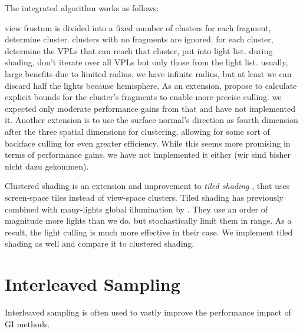 The integrated algorithm works as follows:
\begin{outline}
\1 view frustum is divided into a fixed number of clusters
\1 for each fragment, determine cluster. clusters with no fragments are ignored.
\1 for each cluster, determine the VPLs that can reach that cluster, put into light list.
\1 during shading, don't iterate over all VPLs but only those from the light list.
\1 usually, large benefits due to limited radius. we have infinite radius, but at least we can discard half the lights because hemisphere.
\1 As an extension, \citet{olsson2012clustered} propose to calculate explicit bounds for the cluster's fragments to enable more precise culling. we expected only moderate performance gains from that and have not implemented it.
\1 Another extension is to use the surface normal's direction as fourth dimension after the three spatial dimensions for clustering, allowing for some sort of backface culling for even greater efficiency. While this seems more promising in terms of performance gains, we have not implemented it either (wir sind bisher nicht dazu gekommen).
\end{outline}

Clustered shading is an extension and improvement to \textit{tiled shading} \citep{Olsson:2011:TiledShading}, that uses screen-space tiles instead of view-space clusters. Tiled shading has previously combined with many-lights global illumination by \citet{Tokuyoshi:2016:Stochastic}. They use an order of magnitude more lights than we do, but stochastically limit them in range. As a result, the light culling is much more effective in their case.
We implement tiled shading as well and compare it to clustered shading.


\section{Interleaved Sampling}
\label{sec:concept:interleavedSampling}
Interleaved sampling \citep{Keller:2001:InterleavedSampling} is often used to vastly improve the performance impact of GI methods.

